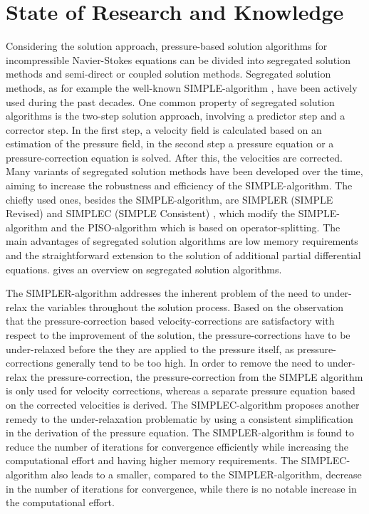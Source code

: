 \section{State of Research and Knowledge}

Considering the solution approach, pressure-based solution algorithms for incompressible Navier-Stokes equations can be divided into segregated solution methods and semi-direct or coupled solution methods. Segregated solution methods, as for example the well-known SIMPLE-algorithm \cite{patankar72}, have been actively used during the past decades. One common property of segregated solution algorithms is the two-step solution approach, involving a predictor step and a corrector step. In the first step, a velocity field is calculated based on an estimation of the pressure field, in the second step a pressure equation or a pressure-correction equation is solved. After this, the velocities are corrected. Many variants of segregated solution methods have been developed over the time, aiming to increase the robustness and efficiency of the SIMPLE-algorithm. The chiefly used ones, besides the SIMPLE-algorithm, are SIMPLER (SIMPLE Revised) \cite{patankar80} and SIMPLEC (SIMPLE Consistent) \cite{doormaal84}, which modify the SIMPLE-algorithm and the PISO-algorithm \cite{issa86} which is based on operator-splitting. The main advantages of segregated solution algorithms are low memory requirements and the straightforward extension to the solution of additional partial differential equations.\cite{darwish00} gives an overview on segregated solution algorithms.

The SIMPLER-algorithm addresses the inherent problem of the need to under-relax the variables throughout the solution process. Based on the observation that the pressure-correction based velocity-corrections are satisfactory with respect to the improvement of the solution, the pressure-corrections have to be under-relaxed before the they are applied to the pressure itself, as pressure-corrections generally tend to be too high. In order to remove the need to under-relax the pressure-correction, the pressure-correction from the SIMPLE algorithm is only used for velocity corrections, whereas a separate pressure equation based on the corrected velocities is derived. The SIMPLEC-algorithm proposes another remedy to the under-relaxation problematic by using a consistent simplification in the derivation of the pressure equation. The SIMPLER-algorithm is found to reduce the number of iterations for convergence efficiently while increasing the computational effort and having higher memory requirements. The SIMPLEC-algorithm also leads to a smaller, compared to the SIMPLER-algorithm, decrease in the number of iterations for convergence, while there is no notable increase in the computational effort. 

